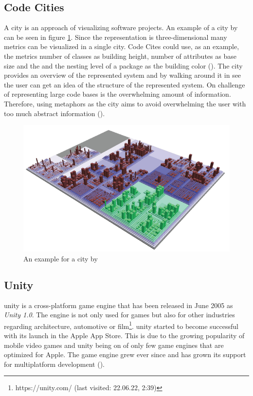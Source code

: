 \subsection{Code Cities}
\label{sec:code_cities}
A \gls{city} is an approach of visualizing software projects.
An example of a \gls{city} by \cite{wettel2007visualizing} can be seen in figure \ref{fig:city_example}.
Since the representation is three-dimensional many metrics can be visualized in a single \gls{city}.
Code Cites could use, as an example, the metrics number of classes as building height, number of attributes as base size and the and the nesting level of a package as the building color (\cite{wettel2008visual}).
The \gls{city} provides an overview of the represented system and by walking around it in \gls{see} the user can get an idea of the structure of the represented system.
On challenge of representing large code bases is the overwhelming amount of information.
Therefore, using metaphors as the \gls{city} aims to avoid overwhelming the user with too much abstract information (\cite{Wettel2008}).
\begin{figure}[htb]
    \centering
    \includegraphics[width=1\textwidth]{Fundamentals/img/code_city.png}
    \caption{An example for a \gls{city} by \cite{wettel2007visualizing}}
    \label{fig:city_example}
\end{figure}

\subsection{Unity}
\gls{unity} is a cross-platform game engine that has been released in June 2005 as \textit{Unity 1.0}.
The engine is not only used for games but also for other industries regarding architecture, automotive or film\footnote{https://unity.com/ (last visited: 22.06.22, 2:39)}.
\gls{unity} started to become successful with its launch in the Apple App Store. 
This is due to the growing popularity of mobile video games and \gls{unity} being on of only few game engines that are optimized for Apple.
The game engine grew ever since and has grown its support for multiplatform development (\cite{nicoll2019unity}).

